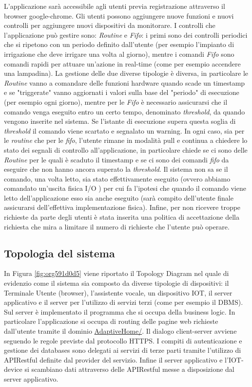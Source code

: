 \documentclass[onecolumn,a4paper]{article}
\begin{document}
L'applicazione sarà accessibile agli utenti previa registrazione attraverso il browser google-chrome. Gli utenti possono aggiungere nuove funzioni e nuovi controlli per aggiungere nuovi dispositivi da monitorare. I controlli che l'applicazione può gestire sono: \emph{Routine} e \emph{Fifo}: i primi sono dei controlli periodici che si ripetono con un periodo definito dall'utente (per esempio l'impianto di irrigazione che deve irrigare una volta al giorno), mentre i comandi \emph{Fifo} sono comandi rapidi per attuare un'azione in real-time (come per esempio accendere una lampadina). La gestione delle due diverse tipologie è diversa, in particolare le \emph{Routine} vanno a comandare delle funzioni hardware quando scade un timestamp e se "triggerate" vanno aggiornati i valori sulla base del "periodo" di esecuzione (per esempio ogni giorno), mentre per le \emph{Fifo} è necessario assicurarsi che il comando venga eseguito entro un certo tempo, denominato \emph{threshold}, da quando vengono inserite nel sistema. Se l'istante di esecuzione supera questa soglia di \emph{threshold} il comando viene scartato e segnalato un warning. In ogni caso, sia per le \emph{routine} che per le \emph{fifo}, l'utente rimane in modalità pull e continua a chiedere lo stato dei segnali di controllo all'applicazione, in particolare chiede se ci sono delle \emph{Routine} per le quali è scaduto il timestamp e se ci sono dei comandi \emph{fifo} da eseguire che non hanno ancora superato la \emph{threshold}. Il sistema non sa se il comando, una volta letto, sia stato effettivamente eseguito (ovvero abbiamo comandato un'uscita fisica I/O ) per cui fa l'ipotesi che quando il comando viene letto dell'applicazione esso sia anche eseguito (sarà compito dell'utente finale assicurarsi dell'effettiva implementazione fisica). Infine, per non ricevere troppe richieste da parte degli utenti è stata inserita una politica di accettazione della richiesta che mira a limitare il numero di richieste che l'utente può operare.

\subsection{Topologia del sistema}
\label{sec:org4b3ae6a}
In Figura \ref{fig:org591d0d5} viene riportato il Topology Diagram nel quale di evidenzio come il sistema sia composto da diverse tipologie di dispositivi: il Terminale Utente (browser), l'assistente vocale, un dispositivo IOT, il server applicativo e il server per l'utilizzo di servizi terzi (come per esempio il DBMS). Sul server è implementato il programma che si occupa della business logic. In particolare l'applicazione si occupa di routing delle pagine web richieste dall'utente tramite il dominio \uline{AdaptiveHome/}. Il dialogo client-server avviene seguendo le regole previste dal protocollo HTTPS. I compiti di autenticazione e gestione dei databases sono delegati ai servizi di terze parti tramite l'utilizzo di APIRestful definite dal provider del servizio. Infine il server applicativo e l'IOT-device si scambiano dati attraverso delle APIRestful messe a disposizione dal server applicativo.
\end{document}
